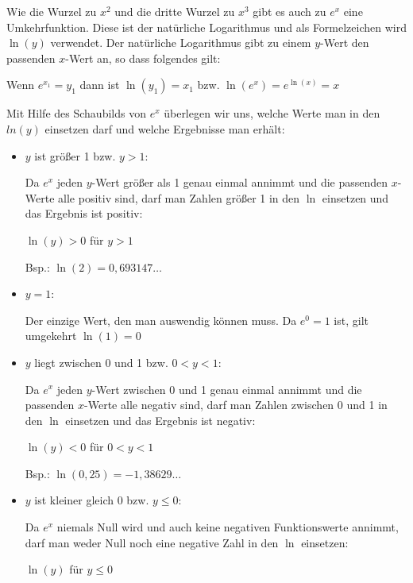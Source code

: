 Wie die Wurzel zu \(x^2\) und die dritte Wurzel zu \(x^3\) gibt es auch zu \(e^x\) eine Umkehrfunktion. Diese ist der natürliche Logarithmus und als Formelzeichen wird \(\ln(y)\) verwendet. Der natürliche Logarithmus gibt zu einem \(y\)-Wert den passenden \(x\)-Wert an, so dass folgendes gilt:
\begin{tcolorbox}\centering
	\textcolor{loestc}{Wenn \(e^{x_1}=y_1\) dann ist \(\ln(y_1)=x_1\) bzw. \(\ln(e^x)=e^{\ln(x)}=x\)}
\end{tcolorbox}
Mit Hilfe des Schaubilds von \(e^x\) überlegen wir uns, welche Werte man in den \(ln(y)\) einsetzen darf und welche Ergebnisse man erhält:

\begin{minipage}{\textwidth}\centering
    \iftoggle{qrcode}{
    \settototalheight{\imgheight}{\texttt{[image: \\eFkt/pics/ln.png]}}%
    \setlength{\qrheight}{2.5cm}%
    \texttt{[image: \\eFkt/pics/ln\\AUSGEFUELLT.png]}%
    \raisebox{\imgheight-\qrheight}{\makebox[0pt][r]{\href{https://www.geogebra.org/m/dduaugse}{\texttt{[image: \\eFkt/pics/natuerlicherLogarithmusQR.png]}}}}%
    }{
    \texttt{[image: \\eFkt/pics/ln\\AUSGEFUELLT.png]}}%
\end{minipage}\vspace{0.2cm}
\begin{itemize}
	\item \(y\) ist größer 1 bzw. \(y>1\):

	\textcolor{loes}{Da \(e^x\) jeden \(y\)-Wert größer als 1 genau einmal annimmt und die passenden \(x\)-Werte alle positiv sind, darf man Zahlen größer 1 in den \(\ln\) einsetzen und das Ergebnis ist positiv:}

	\textcolor{loes}{\(\ln(y)>0\) für \(y>1\)}

	\textcolor{loes}{Bsp.: \(\ln(2)=0,693147\dots\)}
	\item \(y=1\):

	\textcolor{loes}{Der einzige Wert, den man auswendig können muss. Da \(e^0=1\) ist, gilt umgekehrt \(\ln(1)=0\)}
	\item \(y\) liegt zwischen 0 und 1 bzw. \(0<y<1\):

	\textcolor{loes}{Da \(e^x\) jeden \(y\)-Wert zwischen 0 und 1 genau einmal annimmt und die passenden \(x\)-Werte alle negativ sind, darf man Zahlen zwischen 0 und 1 in den \(\ln\) einsetzen und das Ergebnis ist negativ:}

	\textcolor{loes}{\(\ln(y)<0\) für \(0<y<1\)}

	\textcolor{loes}{Bsp.: \(\ln(0,25)=-1,38629\dots\)}
	\item \(y\) ist kleiner gleich 0 bzw. \(y\leq0\):

	\textcolor{loes}{Da \(e^x\) niemals Null wird und auch keine negativen Funktionswerte annimmt, darf man weder Null noch eine negative Zahl in den \(\ln\) einsetzen:}

	\textcolor{loes}{\(\ln(y)\) \Lightning \normalsize für \(y\leq0\)}
\end{itemize}

